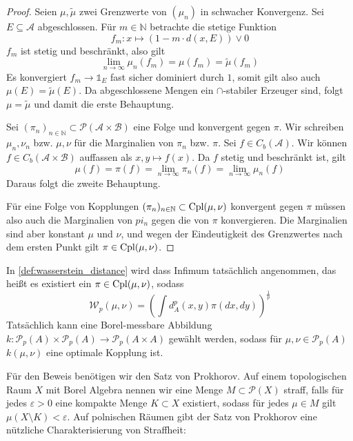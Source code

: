 \begin{proof}
    Seien $\mu, \tilde{\mu}$ zwei Grenzwerte von $(\mu_n)$ in schwacher Konvergenz. Sei $E \subseteq \mathcal{A}$ abgeschlossen. Für $m \in \mathbb{N}$ betrachte die stetige Funktion 
    $$f_m: x \mapsto (1-m\cdot d(x,E)) \vee 0$$
    $f_m$ ist stetig und beschränkt, also gilt 
    $$\lim_{n \rightarrow \infty} \mu_n(f_m) = \mu(f_m) = \tilde{\mu}(f_m)$$
    Es konvergiert $f_m \rightarrow \mathds{1}_E$ fast sicher dominiert durch $1$, somit gilt also auch $\mu(E) =\tilde{\mu}(E)$. Da abgeschlossene Mengen ein $\cap$-stabiler Erzeuger sind, folgt $\mu=\tilde{\mu}$ und damit die erste Behauptung.

    Sei $(\pi_n)_{n\in\mathbb{N}} \subset \mathcal{P}(\mathcal{A}\times\mathcal{B})$ eine Folge und konvergent gegen $\pi$. Wir schreiben $\mu_n, \nu_n$ bzw. $\mu, \nu$ für die Marginalien von $\pi_n$ bzw. $\pi$. Sei $f\in C_b(\mathcal{A})$. Wir können $f \in C_b(\mathcal{A}\times\mathcal{B})$ auffassen als $x,y\mapsto f(x)$. Da $f$ stetig und beschränkt ist, gilt 
    $$\mu(f) = \pi(f) = \lim_{n\rightarrow \infty} \pi_n(f) = \lim_{n\rightarrow\infty} \mu_n(f)$$ 
    Daraus folgt die zweite Behauptung.

    Für eine Folge von Kopplungen $(\pi_n)_{n\in\mathbb{N}} \subset \operatorname{Cpl}(\mu,\nu)$ konvergent gegen $\pi$ müssen also auch die Marginalien von $pi_n$ gegen die von $\pi$ konvergieren. Die Marginalien sind aber konstant $\mu$ und $\nu$, und wegen der Eindeutigkeit des Grenzwertes nach dem ersten Punkt gilt $\pi \in \operatorname{Cpl}(\mu,\nu)$.
\end{proof}
\begin{lemma}\label{thm:optimal_coupling}
In \ref{def:wasserstein_distance} wird dass Infimum tatsächlich angenommen, das heißt es existiert ein $\pi \in \operatorname{Cpl}(\mu, \nu)$, sodass
$$\mathcal{W}_p(\mu, \nu) = \left( \int d^p_A(x, y) \pi(dx, dy) \right)^{\frac{1}{p}}$$
Tatsächlich kann eine Borel-messbare Abbildung $k: \mathcal{P}_p(A) \times \mathcal{P}_p(A) \rightarrow \mathcal{P}_p(A\times A)$ gewählt werden, sodass für $\mu,\nu \in \mathcal{P}_p(A)$ $k(\mu, \nu)$ eine optimale Kopplung ist.
\end{lemma}
Für den Beweis benötigen wir den Satz von Prokhorov. Auf einem topologischen Raum $X$ mit Borel Algebra nennen wir eine Menge $M \subset \mathcal{P}(X)$ straff, falls für jedes $\varepsilon >0$ eine kompakte Menge $K\subset X$ existiert, sodass für jedes $\mu \in M$ gilt $\mu(X\setminus K) < \varepsilon$. Auf polnischen Räumen gibt der Satz von Prokhorov eine nützliche Charakterisierung von Straffheit:
